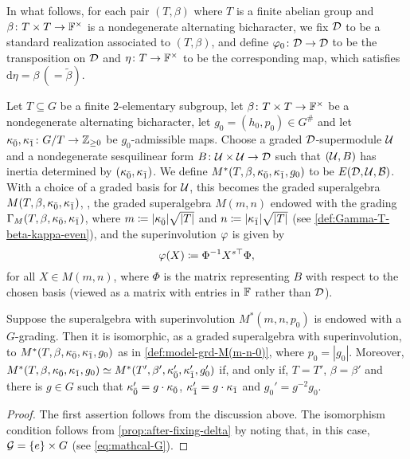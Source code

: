 In what follows, for each pair $(T, \beta)$ where $T$ is a finite abelian group and $\beta\colon {T\times T} \to \mathbb{F}^\times$ is a nondegenerate alternating bicharacter, we fix $\mathcal{D}$ to be a standard realization associated to $(T, \beta)$, and define $\varphi_0\colon \mathcal{D} \to \mathcal{D}$ to be the transposition on $\mathcal{D}$ and $\eta\colon T \to \mathbb{F}^\times$ to be the corresponding map, which satisfies $\mathrm{d}\eta = \beta \, (= \tilde\beta)$. 

\begin{defi}\label{def:model-grd-M(m-n-0)}
    Let $T \subseteq G$ be a finite $2$-elementary subgroup, let $\beta\colon {T\times T} \to \mathbb{F}^\times$ be a nondegenerate alternating bicharacter, let $g_0 = (h_0, p_0) \in G^\#$ and let $\kappa_{\bar{0}}, \kappa_{\bar{1}} \colon G/T \to \mathbb{Z}_{\geq 0}$ be $g_0$-admissible maps. 
    Choose a graded $\mathcal{D}$-supermodule $\mathcal U$ and a nondegenerate sesquilinear form $B\colon \mathcal U\times \mathcal U \to \mathcal{D}$ such that $(\mathcal U, B)$ has inertia determined by $(\kappa_{\bar{0}}, \kappa_{\bar{1}})$. 
    We define $M^*(T, \beta, \kappa_{\bar{0}}, \kappa_{\bar{1}}, g_0)$ to be $E(\mathcal{D}, \mathcal U, \mathcal B)$. 
    With a choice of a graded basis for $\mathcal U$, this becomes
    the graded superalgebra $M (T, \beta, \kappa_{\bar{0}}, \kappa_{\bar{1}})$, \ie, the graded superalgebra $M(m,n)$ endowed with the grading $\Gamma_M(T,\beta,\kappa_{\bar{0}},\kappa_{\bar{1}})$, where $m \coloneqq |\kappa_{\bar{0}}|\sqrt{|T|}$ and $n \coloneqq |\kappa_{\bar{1}}|\sqrt{|T|}$ (see \cref{def:Gamma-T-beta-kappa-even}), and the superinvolution $\varphi$ is given by 
    \[
        \varphi(X) \coloneqq \Phi^{-1} X^{s\top} \Phi,
    \]
    for all $X \in M(m,n)$, where $\Phi$ is the matrix representing $B$ with respect to the chosen basis (viewed as a matrix with entries in $\mathbb{F}$ rather than $\mathcal{D}$). 
\end{defi}

\begin{thm}\label{thm:osp-and-p-associative}
    Suppose the superalgebra with superinvolution $M^*(m,n,p_0)$ is endowed with a $G$-grading. 
    Then it is isomorphic, as a graded superalgebra with superinvolution, to $M^*(T,\beta, \kappa_{\bar{0}}, \kappa_{\bar{1}}, g_0)$ as in \cref{def:model-grd-M(m-n-0)}, where $p_0 = |g_0|$. 
    Moreover, $M^*(T, \beta, \kappa_{\bar{0}}, \kappa_{\bar{1}}, g_0) \simeq M^*(T', \beta', \kappa_{\bar{0}}', \kappa_{\bar{1}}', g_0')$ if, and only if, $T =T'$, $\beta = \beta'$ and there is $g \in G$ such that $\kappa_{\bar{0}}' = g\cdot\kappa_{\bar{0}}$, $\kappa_{\bar{1}}' = g\cdot\kappa_{\bar{1}}$ and $g_0' = g^{-2}g_0$. 
\end{thm}

\begin{proof}
    The first assertion follows from the discussion above. 
    The isomorphism condition follows from \cref{prop:after-fixing-delta} by noting that, in this case, $\mathcal G = \{e\} \times G$ (see \cref{eq:mathcal-G}). 
\end{proof}